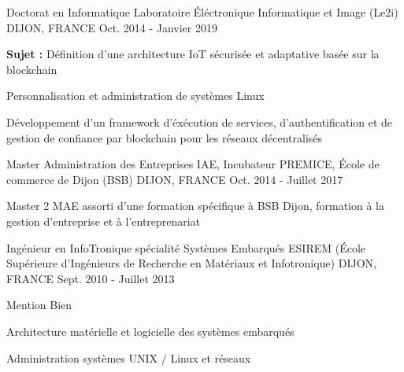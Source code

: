 

\begin{cventries}

  \cventry
    {Doctorat en Informatique} %
    {Laboratoire \'Eléctronique Informatique et Image (Le2i)} %
    {DIJON, FRANCE} %
    {Oct. 2014 - Janvier 2019} %
    {
      \begin{cvitems} %
      \item {\textbf{Sujet : }Définition d'une architecture IoT sécurisée et adaptative basée sur la blockchain}
      \item {Personnalisation et administration de systèmes Linux}
      \item {Développement d'un framework d'éxécution de services, d'authentification et de gestion de confiance par blockchain pour les réseaux décentralisés}
      \end{cvitems}
    }

  \cventry
    {Master Administration des Entreprises} %
    {IAE, Incubateur PREMICE, \'Ecole de commerce de Dijon (BSB)} %
    {DIJON, FRANCE} %
    {Oct. 2014 - Juillet 2017} %
    {
      \begin{cvitems} %
      \item {Master 2 MAE assorti d'une formation spécifique à BSB Dijon, formation à la gestion d'entreprise et à l'entreprenariat}
      \end{cvitems}
    }

  \cventry
    {Ingénieur en InfoTronique spécialité Systèmes Embarqués} %
    {ESIREM (\'Ecole Supérieure d'Ingénieurs de Recherche en Matériaux et Infotronique)} %
    {DIJON, FRANCE} %
    {Sept. 2010 - Juillet 2013} %
    {
      \begin{cvitems} %
      \item {Mention Bien}
      \item {Architecture matérielle et logicielle des systèmes embarqués}
      \item {Administration systèmes UNIX / Linux et réseaux}
      \end{cvitems}
    }


\end{cventries}
